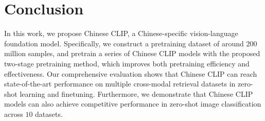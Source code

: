 


\section{Conclusion}
In this work, we propose Chinese CLIP, a Chinese-specific vision-language foundation model. 
Specifically, we construct a pretraining dataset of around $200$ million samples, and pretrain a series of Chinese CLIP models with the proposed two-stage pretraining method, which improves both pretraining efficiency and effectiveness. 
Our comprehensive evaluation shows that Chinese CLIP can reach state-of-the-art performance on multiple cross-modal retrieval datasets in zero-shot learning and finetuning. 
Furthermore, we demonstrate that Chinese CLIP models can also achieve competitive performance in zero-shot image classification across $10$ datasets. 



